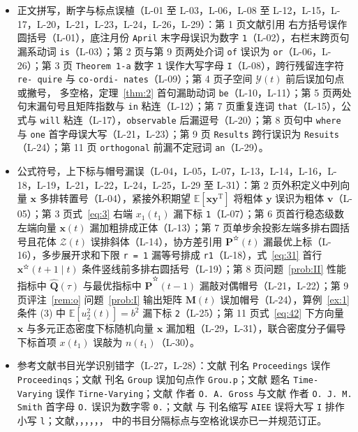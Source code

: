 \begin{itemize}
\item 正文拼写，断字与标点误植（L-01 至 L-03，L-06，L-08 至 L-12，L-15，L-17，L-20，L-21，L-23，L-24，L-26，L-29）：第 1 页文献引用\cite{r02} 右方括号误作圆括号（L-01），底注月份 \texttt{April} 末字母误识为数字 \texttt{1}（L-02），右栏末跨页句漏系动词 \texttt{is}（L-03）；第 2 页与第 9 页两处介词 \texttt{of} 误识为 \texttt{or}（L-06，L-26）；第 3 页 \texttt{Theorem 1-a} 数字 \texttt{1} 误作大写字母 \texttt{I}（L-08），跨行残留连字符 \texttt{re- quire} 与 \texttt{co-ordi- nates}（L-09）；第 4 页子空间 $\mathcal{Y}(t)$ 前后误加句点或撇号，\cite{r16} 多空格，定理~\ref{thm:2} 首句漏助动词 \texttt{be}（L-10，L-11）；第 5 页两处句末漏句号且矩阵指数与 \texttt{in} 粘连（L-12）；第 7 页重复连词 \texttt{that}（L-15），公式与 \texttt{will} 粘连（L-17），\texttt{observable} 后漏逗号（L-20）；第 8 页句中 \texttt{where} 与 \texttt{one} 首字母误大写（L-21，L-23）；第 9 页 \texttt{Results} 跨行误识为 \texttt{Resuits}（L-24）；第 11 页 \texttt{orthogonal} 前漏不定冠词 \texttt{an}（L-29）。
\item 公式符号，上下标与帽号漏误（L-04，L-05，L-07，L-13，L-14，L-16，L-18，L-19，L-21，L-22，L-24，L-25，L-29 至 L-31）：第 2 页外积定义中列向量 $\bm{x}$ 多排转置号（L-04），紧接外积期望 $\mathbb{E}[\bm{x}\bm{y}^{\mathrm{T}}]$ 将粗体 $\bm{y}$ 误识为粗体 $\bm{v}$（L-05）；第 3 页式~\eqref{eq:3} 右端 $x_1(t_1)$ 漏下标 \texttt{1}（L-07）；第 6 页首行稳态级数左端向量 $\bm{x}(t)$ 漏加粗排成正体（L-13）；第 7 页单步余投影左端多排右圆括号且花体 $\mathcal{Z}(t)$ 误排斜体（L-14），协方差引用 $\bm{P}^{\text{✫}}(t)$ 漏最优上标（L-16），多步展开求和下限 \texttt{r = 1} 漏等号排成 \texttt{r1}（L-18），式~\eqref{eq:31} 首行 $\bm{x}^{\text{✫}}(t + 1 \mid t)$ 条件竖线前多排右圆括号（L-19）；第 8 页问题~\ref{prob:II} 性能指标中 $\hat{\bm{Q}}(\tau)$ 与最优指标中 $\hat{\bm{P}}^{\text{✫}}(t - 1)$ 漏敲对偶帽号（L-21，L-22）；第 9 页评注~\ref{rem:o} 问题~\ref{prob:I} 输出矩阵 $\bm{M}(t)$ 误加帽号（L-24），算例~\ref{ex:1} 条件 (3) 中 $\mathbb{E}[u_2^2(t)] = b^2$ 漏下标 \texttt{2}（L-25）；第 11 页式~\eqref{eq:42} 下方向量 $\bm{x}$ 与多元正态密度下标随机向量 $\bm{x}$ 漏加粗（L-29，L-31），联合密度分子偏导下标首项 $x(t_1)$ 误敲为 $n(t_1)$（L-30）。
\item 参考文献书目光学识别错字（L-27，L-28）：文献\cite{r03} 刊名 \texttt{Proceedings} 误作 \texttt{Proceedinqs}；文献\cite{r09} 刊名 \texttt{Group} 误加句点作 \texttt{Grou.p}；文献\cite{r11} 题名 \texttt{Time-Varying} 误作 \texttt{Tirne-Varying}；文献\cite{r17} 作者 \texttt{O. A. Gross} 与文献\cite{r28} 作者 \texttt{O. J. M. Smith} 首字母 \texttt{O.} 误识为数字零 \texttt{0.}；文献\cite{r19} 与\cite{r20} 刊名缩写 \texttt{AIEE} 误将大写 \texttt{I} 排作小写 \texttt{l}；文献\cite{r07}，\cite{r08}，\cite{r10}，\cite{r11}，\cite{r12}，\cite{r14}，\cite{r20} 中的书目分隔标点与空格讹误亦已一并规范订正。
\end{itemize}
